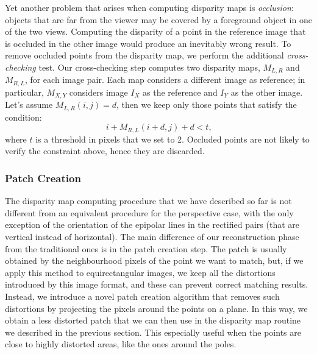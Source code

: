 Yet another problem that arises when computing disparity maps is
\emph{occlusion}: objects that are far from the viewer may be covered by a
foreground object in one of the two views.
Computing the disparity of a point in the reference image that is occluded in
the other image would produce an inevitably wrong result.
To remove occluded points from the disparity map, we perform the additional
\emph{cross-checking} test.
Our cross-checking step computes two disparity maps, $M_{L,R}$ and $M_{R,L}$,
for each image pair. Each map considers a different image as reference;
in particular, $M_{X,Y}$ considers image $I_X$ as the reference and $I_Y$ as the
other image. Let's assume $M_{L,R}(i, j) = d$, then we keep only those points
that satisfy the condition:
%
\begin{equation*}
	i + M_{R, L}(i + d, j) + d< t \text{,}
\end{equation*}
%
\noindent where $t$ is a threshold in pixels that we set to 2.
Occluded points are not likely to verify the constraint above, hence they are
discarded.
\subsubsection{Patch Creation}
\label{subsubsec:patch_creation}
The disparity map computing procedure that we have described so far is not
different from an equivalent procedure for the perspective case,
with the only exception of the orientation of the epipolar lines in the
rectified pairs (that are vertical instead of horizontal).
The main difference of our reconstruction phase from the traditional ones is
in the patch creation step.
The patch is usually obtained by the neighbourhood pixels of the point we want
to match, but, if we apply this method to equirectangular images, we keep all
the distortions introduced by this image format, and these can prevent
correct matching results.
Instead, we introduce a novel patch creation algorithm that removes such
distortions by projecting the pixels around the points on a plane.
In this way, we obtain a less distorted patch that we can then use in the
disparity map routine we described in the previous section.
This especially useful when the points are close to highly distorted areas,
like the ones around the poles.

